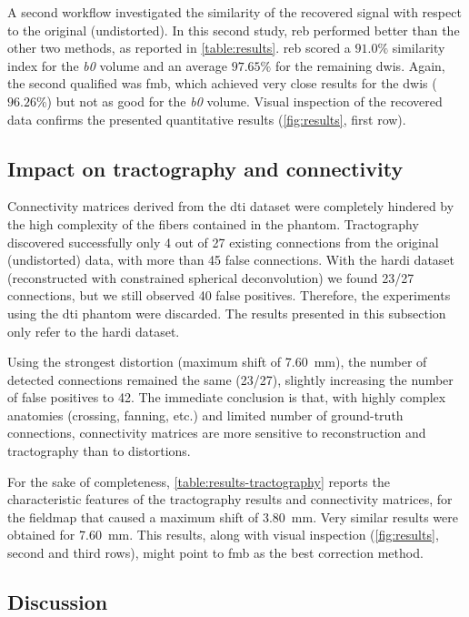 A second workflow investigated the similarity of the recovered
signal with respect to the original (undistorted).
In this second study, \gls*{reb} performed
better than the other two methods, as reported
in \autoref{table:results}. \gls*{reb} scored a $91.0\%$
similarity index for the \textit{b0} volume and an average $97.65\%$
for the remaining \glspl*{dwi}. Again, the second
qualified was \gls*{fmb}, which achieved very close results
for the \glspl*{dwi} ($96.26\%$) but not as good for the \textit{b0}
volume. Visual inspection of the recovered data confirms the 
presented quantitative results (\autoref{fig:results}, first row).



\subsection{Impact on tractography and connectivity}

Connectivity matrices derived from the \gls*{dti} dataset
were completely hindered by the high complexity of the 
fibers contained
in the phantom. Tractography discovered successfully only 4 out 
of 27 existing connections from the original (undistorted) data,
with more than 45 false connections.
With the \gls*{hardi} dataset (reconstructed with constrained 
spherical deconvolution) we found 23/27 connections,
but we still observed 40 false positives. Therefore, the 
experiments using the \gls*{dti} phantom were discarded. The
results presented in this subsection only refer to the 
\gls*{hardi} dataset.

Using the strongest distortion (maximum shift of 7.60~mm),
the number of detected connections
remained the same (23/27), slightly increasing the number of
false positives to 42. The immediate conclusion is that, with highly
complex anatomies (crossing, fanning, etc.) and limited number of
ground-truth connections, connectivity matrices are more sensitive 
to reconstruction and tractography than to distortions.

For the sake of completeness, \autoref{table:results-tractography}
reports the characteristic features of the tractography results
and connectivity matrices, for the fieldmap that caused a maximum
shift of 3.80~mm. Very similar results were obtained for
7.60~mm. This results, along with visual inspection
(\autoref{fig:results}, second and third rows), might point
to \gls*{fmb} as the best correction method.


\subsection{Discussion}

